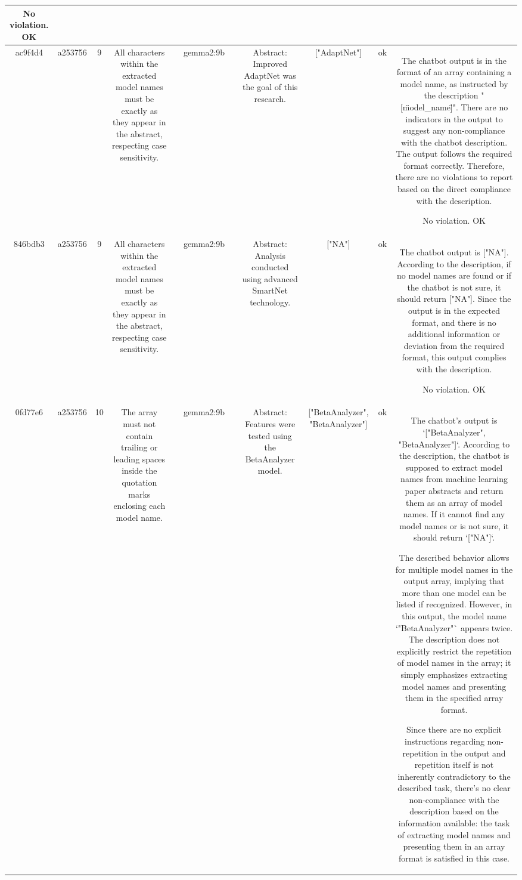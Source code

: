\begin{table}[h!]
\begin{tabular}{|c|c|c|c|c|c|c|c|c|c|c|}
No violation.
OK\\
\hline
ac9f4d4 & a253756 & 9 & All characters within the extracted model names must be exactly as they appear in the abstract, respecting case sensitivity. &  & gemma2:9b &  & Abstract: Improved AdaptNet was the goal of this research. & ["AdaptNet"] 
 & ok & The chatbot output is in the format of an array containing a model name, as instructed by the description "[\"model_name\"]". There are no indicators in the output to suggest any non-compliance with the chatbot description. The output follows the required format correctly. Therefore, there are no violations to report based on the direct compliance with the description.

No violation.
OK\\
\hline
846bdb3 & a253756 & 9 & All characters within the extracted model names must be exactly as they appear in the abstract, respecting case sensitivity. &  & gemma2:9b &  & Abstract: Analysis conducted using advanced SmartNet technology. & ["NA"] 
 & ok & The chatbot output is ["NA"]. According to the description, if no model names are found or if the chatbot is not sure, it should return ["NA"]. Since the output is in the expected format, and there is no additional information or deviation from the required format, this output complies with the description.

No violation.
OK\\
\hline
0fd77e6 & a253756 & 10 & The array must not contain trailing or leading spaces inside the quotation marks enclosing each model name. &  & gemma2:9b &  & Abstract: Features were tested using the BetaAnalyzer model. & ["BetaAnalyzer", "BetaAnalyzer"] 
 & ok & The chatbot's output is `["BetaAnalyzer", "BetaAnalyzer"]`. According to the description, the chatbot is supposed to extract model names from machine learning paper abstracts and return them as an array of model names. If it cannot find any model names or is not sure, it should return `["NA"]`.

The described behavior allows for multiple model names in the output array, implying that more than one model can be listed if recognized. However, in this output, the model name `"BetaAnalyzer"` appears twice. The description does not explicitly restrict the repetition of model names in the array; it simply emphasizes extracting model names and presenting them in the specified array format.

Since there are no explicit instructions regarding non-repetition in the output and repetition itself is not inherently contradictory to the described task, there's no clear non-compliance with the description based on the information available: the task of extracting model names and presenting them in an array format is satisfied in this case.


\end{tabular}
\end{table}

